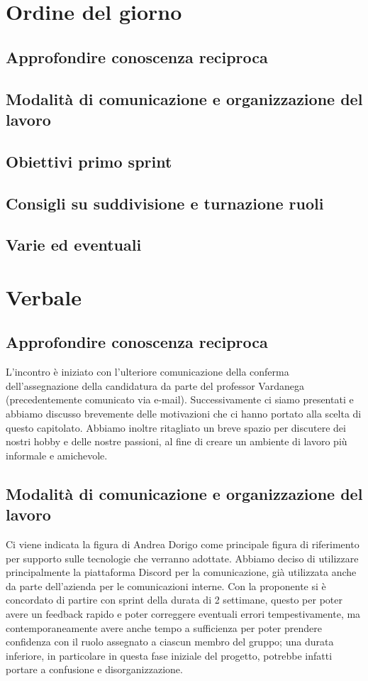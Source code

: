 \documentclass[italian,12pt]{article}
\begin{document}
\section{Ordine del giorno}
\subsection{Approfondire conoscenza reciproca}
\subsection{Modalità di comunicazione e organizzazione del lavoro}
\subsection{Obiettivi primo sprint}
\subsection{Consigli su suddivisione e turnazione ruoli}
\subsection{Varie ed eventuali}

\newpage

\section{Verbale}

\subsection{Approfondire conoscenza reciproca}
L'incontro è iniziato con l'ulteriore comunicazione della conferma dell'assegnazione 
della candidatura da parte del professor Vardanega (precedentemente comunicato via e-mail). 
Successivamente ci siamo presentati e abbiamo discusso brevemente delle motivazioni 
che ci hanno portato alla scelta di questo capitolato. Abbiamo inoltre ritagliato un breve spazio 
per discutere dei nostri hobby e delle nostre passioni, al fine di creare un ambiente di lavoro 
più informale e amichevole.

\subsection{Modalità di comunicazione e organizzazione del lavoro}
Ci viene indicata la figura di Andrea Dorigo come principale figura di riferimento per 
supporto sulle tecnologie che verranno adottate. Abbiamo deciso di utilizzare principalmente 
la piattaforma Discord per la comunicazione, già utilizzata anche da parte dell'azienda per 
le comunicazioni interne. Con la proponente si è concordato di partire con sprint della durata 
di 2 settimane, questo per poter avere un feedback rapido e poter correggere eventuali errori 
tempestivamente, ma contemporaneamente avere anche tempo a sufficienza per poter prendere confidenza 
con il ruolo assegnato a ciascun membro del gruppo; una durata inferiore, in particolare 
in questa fase iniziale del progetto, potrebbe infatti portare a confusione e disorganizzazione.
\end{document}
